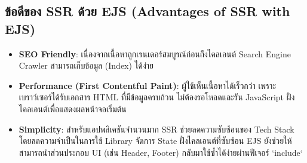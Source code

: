 \subsection{ข้อดีของ SSR ด้วย EJS (Advantages of SSR with EJS)}
\begin{itemize}
    \item \textbf{SEO Friendly}: เนื่องจากเนื้อหาถูกเรนเดอร์สมบูรณ์ก่อนถึงไคลเอนต์ Search Engine Crawler สามารถเก็บข้อมูล (Index) ได้ง่าย
    \item \textbf{Performance (First Contentful Paint)}: ผู้ใช้เห็นเนื้อหาได้เร็วกว่า เพราะเบราว์เซอร์ได้รับเอกสาร HTML ที่มีข้อมูลครบถ้วน ไม่ต้องรอโหลดและรัน JavaScript ฝั่งไคลเอนต์เพื่อแสดงผลหน้าจอเริ่มต้น
    \item \textbf{Simplicity}: สำหรับแอปพลิเคชันจำนวนมาก SSR ช่วยลดความซับซ้อนของ Tech Stack โดยลดความจำเป็นในการใช้ Library จัดการ State ฝั่งไคลเอนต์ที่ซับซ้อน EJS ยังช่วยให้สามารถนำส่วนประกอบ UI (เช่น Header, Footer) กลับมาใช้ซ้ำได้ง่ายผ่านฟีเจอร์ `include`
\end{itemize}
